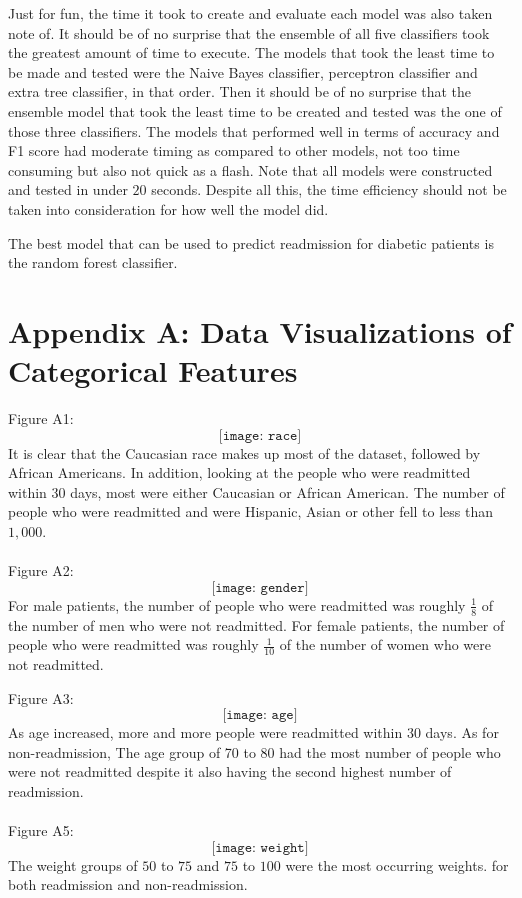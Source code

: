 \documentclass{article}
\begin{document}
Just for fun, the time it took to create and evaluate each model was also taken note of. It should be of no surprise that the ensemble of all five classifiers took the greatest amount of time to execute. The models that took the least time to be made and tested were the Naive Bayes classifier, perceptron classifier and extra tree classifier, in that order. Then it should be of no surprise that the ensemble model that took the least time to be created and tested was the one of those three classifiers. The models that performed well in terms of accuracy and F1 score had moderate timing as compared to other models, not too time consuming but also not quick as a flash. Note that all models were constructed and tested in under $20$ seconds. Despite all this, the time efficiency should not be taken into consideration for how well the model did. 

The best model that can be used to predict readmission for diabetic patients is the random forest classifier.

\newpage
\section{Appendix A: Data Visualizations of Categorical Features}
Figure A1: 
 $$ \texttt{[image: race]}$$ 
It is clear that the Caucasian race makes up most of the dataset, followed by African Americans. In addition, looking at the people who were readmitted within $30$ days, most were either Caucasian or African American. The number of people who were readmitted and were Hispanic, Asian or other fell to less than $1,000$. 
\\~\\
Figure A2: $$ \texttt{[image: gender]}$$ 
For male patients, the number of people who were readmitted was roughly $\frac{1}{8}$ of the number of men who were not readmitted. For female patients, the number of people who were readmitted was roughly $\frac{1}{10}$ of the number of women who were not readmitted. 

Figure A3: $$ \texttt{[image: age]}$$ 
As age increased, more and more people were readmitted within $30$ days. As for non-readmission, The age group of 70 to 80 had the most number of people who were not readmitted despite it also having the second highest number of readmission. 
\\~\\
Figure A5: $$ \texttt{[image: weight]}$$ 
The weight groups of $50$ to $75$ and $75$ to $100$ were the most occurring weights. for both readmission and non-readmission. 
\end{document}
